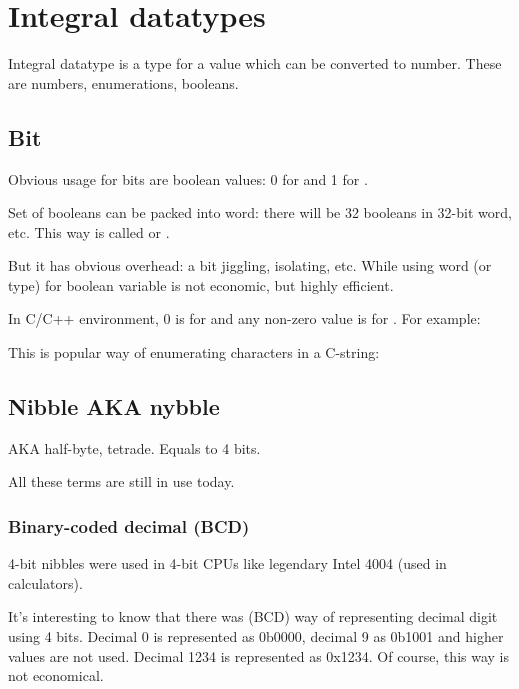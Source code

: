 \section{Integral datatypes}

Integral datatype is a type for a value which can be converted to number.
These are numbers, enumerations, booleans.

\subsection{Bit}

Obvious usage for bits are boolean values: 0 for  and 1 for .

Set of booleans can be packed into \gls{word}: there will be 32 booleans in 32-bit word, etc.
This way is called  or .

But it has obvious overhead: a bit jiggling, isolating, etc.
While using \gls{word} (or  type) for boolean variable is not economic, but highly efficient.

In C/C++ environment, 0 is for  and any non-zero value is for .
For example:



This is popular way of enumerating characters in a C-string:



\subsection{Nibble AKA nybble}

\ac{AKA} half-byte, tetrade.
Equals to 4 bits.

All these terms are still in use today.

\subsubsection{Binary-coded decimal (\ac{BCD})}
\label{BCD}


4-bit nibbles were used in 4-bit CPUs like legendary Intel 4004 (used in calculators).

It's interesting to know that there was  (\ac{BCD}) way of representing decimal digit using 4 bits.
Decimal 0 is represented as 0b0000, decimal 9 as 0b1001 and higher values are not used.
Decimal 1234 is represented as 0x1234.
Of course, this way is not economical.

